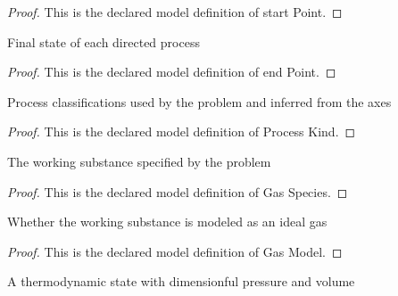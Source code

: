 \begin{proof}
  This is the declared model definition of start Point.
\end{proof}
\begin{definition}
  \label{def:physics:phyx-mini-0353:phyxminiproblems-problemphyxmini0353-endpoint}
  Final state of each directed process
\end{definition}
\begin{proof}
  This is the declared model definition of end Point.
\end{proof}
\begin{definition}
  \label{def:physics:phyx-mini-0353:phyxminiproblems-problemphyxmini0353-processkind}
  Process classifications used by the problem and inferred from the axes
\end{definition}
\begin{proof}
  This is the declared model definition of Process Kind.
\end{proof}
\begin{definition}
  \label{def:physics:phyx-mini-0353:phyxminiproblems-problemphyxmini0353-gasspecies}
  The working substance specified by the problem
\end{definition}
\begin{proof}
  This is the declared model definition of Gas Species.
\end{proof}
\begin{definition}
  \label{def:physics:phyx-mini-0353:phyxminiproblems-problemphyxmini0353-gasmodel}
  Whether the working substance is modeled as an ideal gas
\end{definition}
\begin{proof}
  This is the declared model definition of Gas Model.
\end{proof}
\begin{definition}
  \label{def:physics:phyx-mini-0353:phyxminiproblems-problemphyxmini0353-gasstate}
  A thermodynamic state with dimensionful pressure and volume
\end{definition}
